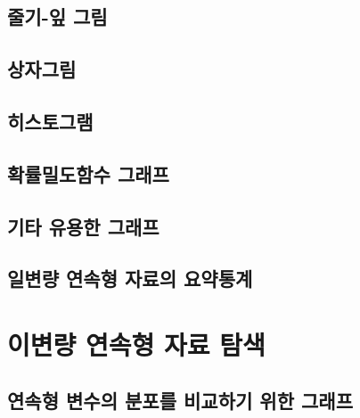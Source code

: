 \documentclass[
]{book}
\begin{document}
\hypertarget{uxc904uxae30-uxc78e-uxadf8uxb9bc}{%
\subsection{줄기-잎 그림}\label{uxc904uxae30-uxc78e-uxadf8uxb9bc}}

\hypertarget{section-boxplot}{%
\subsection{상자그림}\label{section-boxplot}}

\hypertarget{uxd788uxc2a4uxd1a0uxadf8uxb7a8}{%
\subsection{히스토그램}\label{uxd788uxc2a4uxd1a0uxadf8uxb7a8}}

\hypertarget{section-prob-density}{%
\subsection{확률밀도함수 그래프}\label{section-prob-density}}

\hypertarget{uxae30uxd0c0-uxc720uxc6a9uxd55c-uxadf8uxb798uxd504}{%
\subsection{기타 유용한 그래프}\label{uxae30uxd0c0-uxc720uxc6a9uxd55c-uxadf8uxb798uxd504}}

\hypertarget{uxc77cuxbcc0uxb7c9-uxc5f0uxc18duxd615-uxc790uxb8ccuxc758-uxc694uxc57duxd1b5uxacc4}{%
\subsection{일변량 연속형 자료의 요약통계}\label{uxc77cuxbcc0uxb7c9-uxc5f0uxc18duxd615-uxc790uxb8ccuxc758-uxc694uxc57duxd1b5uxacc4}}

\hypertarget{uxc774uxbcc0uxb7c9-uxc5f0uxc18duxd615-uxc790uxb8cc-uxd0d0uxc0c9}{%
\section{이변량 연속형 자료 탐색}\label{uxc774uxbcc0uxb7c9-uxc5f0uxc18duxd615-uxc790uxb8cc-uxd0d0uxc0c9}}

\hypertarget{uxc5f0uxc18duxd615-uxbcc0uxc218uxc758-uxbd84uxd3ecuxb97c-uxbe44uxad50uxd558uxae30-uxc704uxd55c-uxadf8uxb798uxd504}{%
\subsection{연속형 변수의 분포를 비교하기 위한 그래프}\label{uxc5f0uxc18duxd615-uxbcc0uxc218uxc758-uxbd84uxd3ecuxb97c-uxbe44uxad50uxd558uxae30-uxc704uxd55c-uxadf8uxb798uxd504}}
\end{document}
